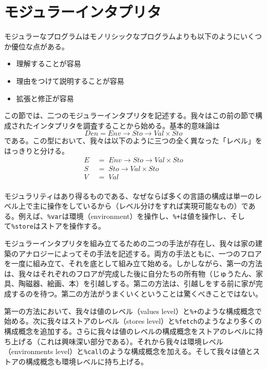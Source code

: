 \documentclass[11pt, oneside]{jsbook}   	%
\begin{document}
\section{モジュラーインタプリタ}
モジュラーなプログラムはモノリシックなプログラムよりも以下のようにいくつか優位な点がある。
\begin{itemize}
\item 理解することが容易
\item 理由をつけて説明することが容易
\item 拡張と修正が容易
\end{itemize}
この節では、二つのモジュラーインタプリタを記述する。我々はこの前の節で構成されたインタプリタを調査することから始める。基本的意味論は
$$
Den = Env \rightarrow Sto \rightarrow Val \times Sto
$$
である。この型において、我々は以下のように三つの全く異なった「レベル」をはっきりと分ける。
$$
\begin{aligned}
E \;&=\; Env \rightarrow Sto \rightarrow Val \times Sto \\
S \;&=\; Sto \rightarrow Val \times Sto \\
V \;&=\; Val \\
\end{aligned}
$$
\newpage

\newpage

\newpage


モジュラリティはあり得るものである、なぜならば多くの言語の構成は単一のレベル上で主に操作をしているから（レベル分けをすれば実現可能なもの）である。例えば、\verb|%var|は環境（environment）を操作し、\verb|%+|は値を操作し、そして\verb|%store|はストアを操作する。

モジュラーインタプリタを組み立てるための二つの手法が存在し、我々は家の建築のアナロジーによってその手法を記述する。両方の手法ともに、一つのフロアを一度に組み立て、それを底として組み立て始める。しかしながら、第一の方法は、我々はそれぞれのフロアが完成した後に自分たちの所有物（じゅうたん、家具、陶磁器、絵画、本）を引越しする。第二の方法は、引越しをする前に家が完成するのを待つ。第二の方法がうまくいくということは驚くべきことではない。

第一の方法において、我々は値のレベル（values level）と\verb|%+|のような構成概念で始める。次に我々はストアのレベル（stores level）と\verb|%fetch|のようなより多くの構成概念を追加する。さらに我々は値のレベルの構成概念をストアのレベルに持ち上げる（これは興味深い部分である）。それから我々は環境レベル（environments level）と\verb|%call|のような構成概念を加える。そして我々は値とストアの構成概念も環境レベルに持ち上げる。
\end{document}
